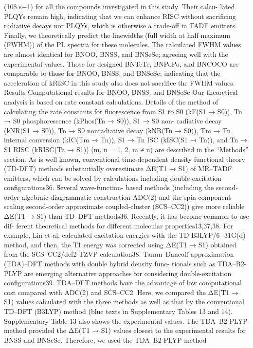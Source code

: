 (108 s−1) for all the compounds investigated in this study. Their calcu-
lated PLQYs remain high, indicating that we can enhance RISC without
sacriﬁcing radiative decays nor PLQYs, which is otherwise a trade-off in
TADF emitters. Finally, we theoretically predict the linewidths (full
width at half maximum (FWHM)) of the PL spectra for these molecules.
The calculated FWHM values are almost identical for BNOO, BNSS, and
BNSeSe; agreeing well with the experimental values. Those for
designed BNTeTe, BNPoPo, and BNCOCO are comparable to those for
BNOO, BNSS, and BNSeSe; indicating that the acceleration of kRISC in
this study also does not sacriﬁce the FWHM values.
Results
Computational results for BNOO, BNSS, and BNSeSe
Our theoretical analysis is based on rate constant calculations. Details of
the method of calculating the rate constants for ﬂuorescence from S1 to
S0 (kF(S1 → S0)), Tn → S0 phosphorescence (kPhos(Tn → S0)), S1 → S0 non-
radiative decay (kNR(S1 → S0)), Tn → S0 nonradiative decay (kNR(Tn → S0)),
Tm → Tn internal conversion (kIC(Tm → Tn)), S1 → Tn ISC (kISC(S1 → Tn)),
and Tn → S1 RISC (kRISC(Tn → S1)) (m, n = 1, 2, m ≠ n) are described in the
“Methods” section. As is well known, conventional time-dependent
density functional theory (TD-DFT) methods substantially overestimate
ΔE(T1 → S1) of MR–TADF emitters, which can be solved by calculations
including double-excitation conﬁgurations36. Several wave-function-
based methods (including the second-order algebraic-diagrammatic
construction ADC(2) and the spin-component-scaling second-order
approximate coupled-cluster (SCS–CC2)) give more reliable ΔE(T1 → S1)
than TD–DFT methods36. Recently, it has become common to use dif-
ferent theoretical methods for different molecular properties13,37,38. For
example, Lin et al. calculated excitation energies with the TD-B3LYP/6-
31G(d) method, and then, the T1 energy was corrected using ΔE(T1 → S1)
obtained from the SCS–CC2/def2-TZVP calculation38. Tamm–Dancoff
approximation (TDA)–DFT methods with double hybrid density func-
tionals such as TDA–B2-PLYP are emerging alternative approaches for
considering double-excitation conﬁgurations39. TDA–DFT methods
have the advantage of low computational cost compared with ADC(2)
and SCS–CC2. Here, we compared the ΔE(T1 → S1) values calculated with
the three methods as well as that by the conventional TD–DFT (B3LYP)
method (blue texts in Supplementary Tables 13 and 14). Supplementary
Table 13 also shows the experimental values. The TDA–B2-PLYP method
provided the ΔE(T1 → S1) values closest to the experimental results for
BNSS and BNSeSe. Therefore, we used the TDA–B2-PLYP method
